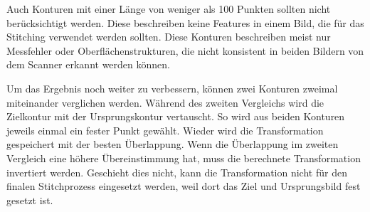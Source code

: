 Auch Konturen mit einer Länge von weniger als 100 Punkten sollten nicht berücksichtigt 
werden. Diese beschreiben keine Features in einem Bild, die für das Stitching verwendet 
werden sollten. Diese Konturen beschreiben meist nur Messfehler oder 
Oberflächenstrukturen, die nicht konsistent in beiden Bildern von dem Scanner erkannt 
werden können.

Um das Ergebnis noch weiter zu verbessern, können zwei Konturen zweimal miteinander 
verglichen werden. Während des zweiten Vergleichs wird die Zielkontur mit der 
Ursprungskontur vertauscht. So wird aus beiden Konturen jeweils einmal ein fester 
Punkt gewählt. Wieder wird die Transformation gespeichert mit der besten Überlappung.
Wenn die Überlappung im zweiten Vergleich eine höhere Übereinstimmung hat, muss die 
berechnete Transformation invertiert werden. Geschieht dies nicht, kann die 
Transformation nicht für den finalen Stitchprozess eingesetzt werden, weil dort 
das Ziel und Ursprungsbild fest gesetzt ist.
